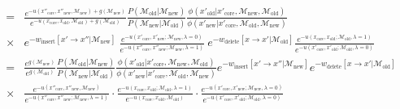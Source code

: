 \documentclass[aps,pre,twocolumn,nofootinbib,superscriptaddress,linenumbers,11point]{revtex4-1}
\begin{document}
\begin{widetext}
\begin{eqnarray}
&=& \frac{e^{-u(x''_\mathrm{core}, x''_\mathrm{new}, \mathcal{M}_\mathrm{new}) + g(\mathcal{M}_\mathrm{new})}}{e^{-u(x_\mathrm{core}, x_\mathrm{old}, \mathcal{M}_\mathrm{old}) + g(\mathcal{M}_\mathrm{old})}} \frac{P(\mathcal{M}_\mathrm{old} | \mathcal{M}_\mathrm{new})}{P(\mathcal{M}_\mathrm{new} | \mathcal{M}_\mathrm{old})} \frac{\phi(x'_\mathrm{old} | x'_\mathrm{core}, \mathcal{M}_\mathrm{new}, \mathcal{M}_\mathrm{old})}{\phi(x'_\mathrm{new} | x'_\mathrm{core}, \mathcal{M}_\mathrm{old}, \mathcal{M}_\mathrm{new})} \nonumber \\
&\times& e^{-w_\mathrm{insert}[x' \rightarrow x'' | \mathcal{M}_\mathrm{new}]} \: \frac{e^{-u(x'_\mathrm{core}, x'_\mathrm{new}; \mathcal{M}_\mathrm{new},\lambda=0)}}{e^{-u(x''_\mathrm{core}, x''_\mathrm{new};\mathcal{M}_\mathrm{new}, \lambda=1)}} \: e^{-w_\mathrm{delete}[x \rightarrow x' | \mathcal{M}_\mathrm{old}]} \frac{e^{-u(x_\mathrm{core}, x_\mathrm{old};\mathcal{M}_\mathrm{old},\lambda=1)}}{e^{-u(x'_\mathrm{core}, x'_\mathrm{old};\mathcal{M}_\mathrm{old},\lambda=0)}} \\
&=& \frac{e^{g(\mathcal{M}_\mathrm{new})}}{e^{g(\mathcal{M}_\mathrm{old})}} \frac{P(\mathcal{M}_\mathrm{old} | \mathcal{M}_\mathrm{new})}{P(\mathcal{M}_\mathrm{new} | \mathcal{M}_\mathrm{old})} \frac{\phi(x'_\mathrm{old} | x'_\mathrm{core}, \mathcal{M}_\mathrm{new}, \mathcal{M}_\mathrm{old})}{\phi(x'_\mathrm{new} | x'_\mathrm{core}, \mathcal{M}_\mathrm{old}, \mathcal{M}_\mathrm{new})} e^{-w_\mathrm{insert}[x' \rightarrow x'' | \mathcal{M}_\mathrm{new}]} e^{-w_\mathrm{delete}[x \rightarrow x' | \mathcal{M}_\mathrm{old}]} \nonumber \\
&\times& \frac{e^{-u(x''_\mathrm{core}, x''_\mathrm{new}, \mathcal{M}_\mathrm{new})}}{e^{-u(x''_\mathrm{core}, x''_\mathrm{new};\mathcal{M}_\mathrm{new}, \lambda=1)}} \cdot \frac{e^{-u(x_\mathrm{core}, x_\mathrm{old};\mathcal{M}_\mathrm{old},\lambda=1)}}{e^{-u(x_\mathrm{core}, x_\mathrm{old}, \mathcal{M}_\mathrm{old})}} \cdot \frac{e^{-u(x'_\mathrm{core}, x'_\mathrm{new}; \mathcal{M}_\mathrm{new},\lambda=0)}}{e^{-u(x'_\mathrm{core}, x'_\mathrm{old};\mathcal{M}_\mathrm{old},\lambda=0)}} \label{equation:two-stage-acceptance-criteria}
\end{eqnarray}
\end{widetext}

\end{document}
